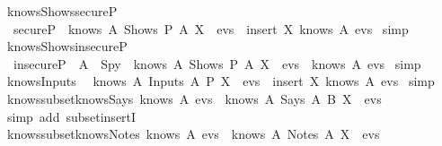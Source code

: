 \begin{isabellebody}
  {\isafoldproof}%
  \isadelimproof
  \isanewline
  \endisadelimproof
  \isanewline
  \isamarkupfalse%
  \ knows{\isacharunderscore}Shows{\isacharunderscore}secureP{\isacharcolon}\isanewline
  \ \ {\isachardoublequoteopen}secureP\ {\isasymlongrightarrow}\ knows\ A\ {\isacharparenleft}Shows\ P\ A\ X\ {\isacharhash}\ evs{\isacharparenright}\ {\isacharequal}\ insert\ X\ {\isacharparenleft}knows\ A\ evs{\isacharparenright}{\isachardoublequoteclose}\isanewline
  \isadelimproof
  \endisadelimproof
  \isatagproof
  \isamarkupfalse%
  \ simp%
  \endisatagproof
  {\isafoldproof}%
  \isadelimproof
  \isanewline
  \endisadelimproof
  \isanewline
  \isamarkupfalse%
  \ knows{\isacharunderscore}Shows{\isacharunderscore}insecureP{\isacharcolon}\isanewline
  \ \ {\isachardoublequoteopen}{\isacharparenleft}insecureP\ {\isasymand}\ A\ {\isasymnoteq}\ Spy{\isacharparenright}\ {\isasymlongrightarrow}\ knows\ A\ {\isacharparenleft}Shows\ P\ A\ X\ {\isacharhash}\ evs{\isacharparenright}\ {\isacharequal}\ knows\ A\ evs{\isachardoublequoteclose}\isanewline
  \isadelimproof
  \endisadelimproof
  \isatagproof
  \isamarkupfalse%
  \ simp%
  \endisatagproof
  {\isafoldproof}%
  \isadelimproof
  \isanewline
  \endisadelimproof
  \isanewline
  \isamarkupfalse%
  \ knows{\isacharunderscore}Inputs{\isacharcolon}\isanewline
  \ \ {\isachardoublequoteopen}knows\ A\ {\isacharparenleft}Inputs\ A\ P\ X\ {\isacharhash}\ evs{\isacharparenright}\ {\isacharequal}\ insert\ X\ {\isacharparenleft}knows\ A\ evs{\isacharparenright}{\isachardoublequoteclose}\isanewline
  \isadelimproof
  \endisadelimproof
  \isatagproof
  \isamarkupfalse%
  \ simp%
  \endisatagproof
  {\isafoldproof}%
  \isadelimproof
  \isanewline
  \endisadelimproof
  \isanewline
  \isamarkupfalse%
  \ knows{\isacharunderscore}subset{\isacharunderscore}knows{\isacharunderscore}Says{\isacharcolon}\ {\isachardoublequoteopen}knows\ A\ evs\ {\isasymsubseteq}\ knows\ A\ {\isacharparenleft}Says\ A{\isacharprime}\ B\ X\ {\isacharhash}\ evs{\isacharparenright}{\isachardoublequoteclose}\isanewline
  \isadelimproof
  \endisadelimproof
  \isatagproof
  \isamarkupfalse%
  \ {\isacharparenleft}simp\ add{\isacharcolon}\ subset{\isacharunderscore}insertI{\isacharparenright}%
  \endisatagproof
  {\isafoldproof}%
  \isadelimproof
  \isanewline
  \endisadelimproof
  \isanewline
  \isamarkupfalse%
  \ knows{\isacharunderscore}subset{\isacharunderscore}knows{\isacharunderscore}Notes{\isacharcolon}\ {\isachardoublequoteopen}knows\ A\ evs\ {\isasymsubseteq}\ knows\ A\ {\isacharparenleft}Notes\ A{\isacharprime}\ X\ {\isacharhash}\ evs{\isacharparenright}{\isachardoublequoteclose}\isanewline

\end{isabellebody}
